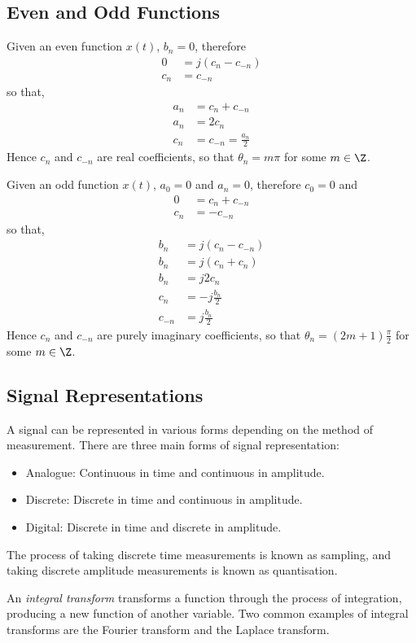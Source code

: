 \documentclass{article}
\begin{document}
\subsection{Even and Odd Functions}
Given an even function \(x\left( t \right)\), \(b_n = 0\), therefore
\begin{align*}
    0   & = j \left( c_n - c_{-n} \right) \\
    c_n & = c_{-n}
\end{align*}
so that,
\begin{align*}
    a_n & = c_n + c_{-n}           \\
    a_n & = 2 c_n                  \\
    c_n & = c_{-n} = \frac{a_n}{2}
\end{align*}
Hence \(c_n\) and \(c_{-n}\) are real coefficients, so that \(\theta_n = m \pi\) for some \(m \in \Z\).

Given an odd function \(x\left( t \right)\), \(a_0 = 0\) and \(a_n = 0\), therefore \(c_0 = 0\) and
\begin{align*}
    0   & = c_n + c_{-n} \\
    c_n & = -c_{-n}
\end{align*}
so that,
\begin{align*}
    b_n    & = j \left( c_n - c_{-n} \right) \\
    b_n    & = j \left( c_n + c_n \right)    \\
    b_n    & = j 2 c_n                       \\
    c_n    & = -j \frac{b_n}{2}              \\
    c_{-n} & = j \frac{b_n}{2}
\end{align*}
Hence \(c_n\) and \(c_{-n}\) are purely imaginary coefficients, so that \(\theta_n = \left( 2m + 1 \right) \frac{\pi}{2}\) for some \(m \in \Z\).
\subsection{Signal Representations}
A signal can be represented in various forms depending on the method of measurement. There are three main forms of signal representation:
\begin{itemize}
    \item Analogue: Continuous in time and continuous in amplitude.
    \item Discrete: Discrete in time and continuous in amplitude.
    \item Digital: Discrete in time and discrete in amplitude.
\end{itemize}
The process of taking discrete time measurements is known as sampling, and taking discrete amplitude measurements is known as quantisation.
\begin{definition}
    An \textit{integral transform} transforms a function through the process of integration, producing a new function of another variable.
    Two common examples of integral transforms are the Fourier transform and the Laplace transform.
\end{definition}
\end{document}

